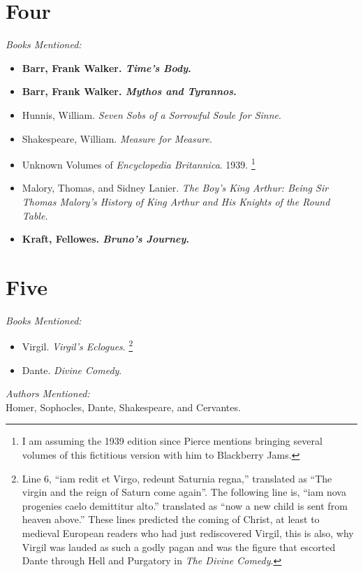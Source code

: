 \documentclass[12pt,makeidx]{extreport}
\begin{document}
\section{Four}
\textit{Books Mentioned:}
\begin{itemize}
\item \textbf{Barr, Frank Walker. \textit{Time's Body}.} \cite{Barr}
\item \textbf{Barr, Frank Walker. \textit{Mythos and Tyrannos}.} \cite{Barra}
\item Hunnis, William. \textit{Seven Sobs of a Sorrowful Soule for Sinne}. \cite{Hunnis1600}
\item Shakespeare, William. \textit{Measure for Measure}. \cite{Shakespeare2006}
\item Unknown Volumes of \textit{Encyclopedia Britannica}. 1939. \cite{Brit1939}\footnote{I am assuming the 1939 edition since Pierce mentions bringing several volumes of this fictitious version with him to Blackberry Jams.}
\item Malory, Thomas, and Sidney Lanier. \textit{The Boy's King Arthur: Being Sir Thomas Malory's History of King Arthur and His Knights of the Round Table.} \cite{Lanier1937}
\item \textbf{Kraft, Fellowes. \textit{Bruno's Journey}.} \cite{Kraft1931}
\end{itemize}

\section{Five}
\textit{Books Mentioned:}
\begin{itemize}
\item Virgil. \textit{Virgil's Eclogues}. \cite{Virgil2011}\footnote{Line 6, ``iam redit et Virgo, redeunt Saturnia regna,'' translated as ``The virgin and the reign of Saturn come again''. The following line is, ``iam nova progenies caelo demittitur alto.'' translated as ``now a new child is sent from heaven above.'' These lines predicted the coming of Christ, at least to medieval European readers who had just rediscovered Virgil, this is also, why Virgil was lauded as such a godly pagan and was the figure that escorted Dante through Hell and Purgatory in \textit{The Divine Comedy}.}
\item Dante. \textit{Divine Comedy}. \cite{Dante1950}
\end{itemize}
\textit{Authors Mentioned:}\\
Homer, Sophocles, Dante, Shakespeare, and Cervantes.
\end{document}
